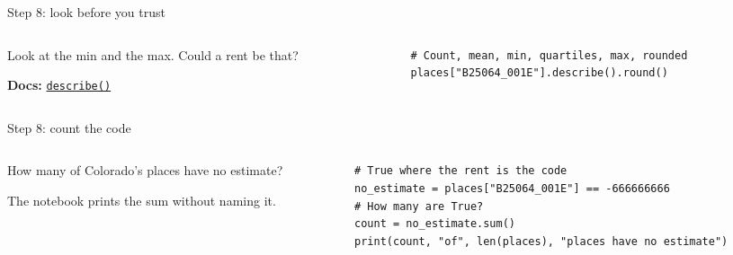 \documentclass[9pt,aspectratio=169]{beamer}
\begin{document}
\begin{frame}[fragile]{Step 8: look before you trust}
    \begin{columns}[T]
        \begin{column}{0.37\textwidth}
            Look at the min and the max. Could a rent be that?

            \medskip
            {\scriptsize\textbf{Docs:} \href{https://pandas.pydata.org/docs/reference/api/pandas.Series.describe.html}{\texttt{describe()}}\par}
        \end{column}
        \begin{column}{0.6\textwidth}
\begin{lstlisting}
# Count, mean, min, quartiles, max, rounded
places["B25064_001E"].describe().round()
\end{lstlisting}
        \end{column}
    \end{columns}
\end{frame}

\begin{frame}[fragile]{Step 8: count the code}
    \begin{columns}[T]
        \begin{column}{0.37\textwidth}
            How many of Colorado's places have no estimate?

            \medskip
            The notebook prints the sum without naming it.
        \end{column}
        \begin{column}{0.6\textwidth}
\begin{lstlisting}
# True where the rent is the code
no_estimate = places["B25064_001E"] == -666666666
# How many are True?
count = no_estimate.sum()
print(count, "of", len(places), "places have no estimate")
\end{lstlisting}
        \end{column}
    \end{columns}
\end{frame}
\end{document}
